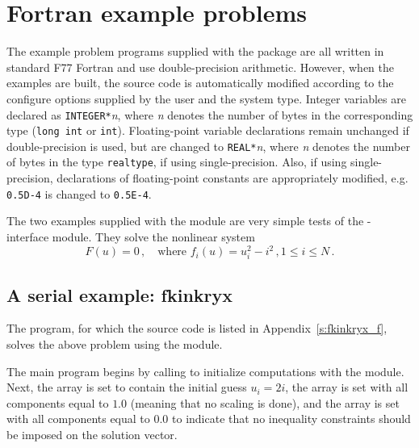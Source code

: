 \section{Fortran example problems}\label{s:ex_fortran}

The {\F} example problem programs supplied with the {\kinsol}
package are all written in standard F77 Fortran and use double-precision
arithmetic. However, when the {\F} examples are built, the source code is
automatically modified according to the configure options supplied by the
user and the system type. Integer variables are declared as {\tt INTEGER*}{\em n},
where {\em n} denotes the number of bytes in the corresponding {\C} type
({\tt long int} or {\tt int}). Floating-point variable declarations remain
unchanged if double-precision is used, but are changed to {\tt REAL*}{\em n},
where {\em n} denotes the number of bytes in the {\sundials} type {\tt realtype},
if using single-precision. Also, if using single-precision, declarations of
floating-point constants are appropriately modified, e.g. {\tt 0.5D-4} is
changed to {\tt 0.5E-4}.


The two examples supplied with the {\fkinsol} module are very simple tests 
of the {\F}-{\C} interface module. 
They solve the nonlinear system
\begin{equation*}
  F(u) = 0 \, , \quad \text{where } f_i(u) = u_i^2 - i^2 \, , 1 \le i \le N \, . 
\end{equation*}

\subsection{A serial example: fkinkryx}\label{ss:fkinkryx}

The  program, for which the source code is listed in
Appendix~\ref{s:fkinkryx_f}, solves the above problem using the
{\nvecs} module.

The main program begins by calling  to initialize computations
with the {\nvecs} module. Next, the array  is set to contain
the initial guess $u_i = 2 i$, the array  is set with all 
components equal to $1.0$ (meaning that no scaling is done), and the array
 is set with all components equal to $0.0$ to indicate that no 
inequality constraints should be imposed on the solution vector.

